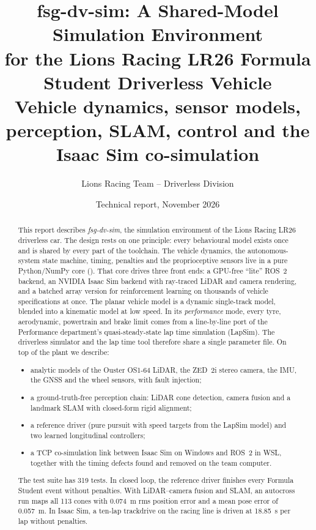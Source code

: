 \documentclass[11pt]{article}
\title{\textbf{fsg-dv-sim: A Shared-Model Simulation Environment\\for the Lions Racing LR26 Formula Student Driverless Vehicle}\\[4pt]
\large Vehicle dynamics, sensor models, perception, SLAM, control and the Isaac Sim co-simulation}
\author{Lions Racing Team -- Driverless Division}
\affil{Formula Student Germany}
\date{Technical report, November 2026}
\begin{document}
\maketitle
\thispagestyle{fancy}

\begin{abstract}
\noindent
This report describes \emph{fsg-dv-sim}, the simulation environment of the Lions Racing LR26 driverless car. The
design rests on one principle: every behavioural model exists once and is shared by every part of the toolchain. The
vehicle dynamics, the autonomous-system state machine, timing, penalties and the proprioceptive sensors live in a
pure Python/NumPy core (). That core drives three front ends: a GPU-free ``lite'' ROS~2 backend, an
NVIDIA Isaac Sim backend with ray-traced LiDAR and camera rendering, and a batched array version for reinforcement
learning on thousands of vehicle specifications at once. The planar vehicle model is a dynamic single-track model,
blended into a kinematic model at low speed. In its \emph{performance} mode, every tyre, aerodynamic, powertrain and
brake limit comes from a line-by-line port of the Performance department's quasi-steady-state lap time simulation
(LapSim). The driverless simulator and the lap time tool therefore share a single parameter file. On top of the
plant we describe:
\begin{itemize}
  \item analytic models of the Ouster OS1-64 LiDAR, the ZED~2i stereo camera, the IMU, the GNSS and the wheel
        sensors, with fault injection;
  \item a ground-truth-free perception chain: LiDAR cone detection, camera fusion and a landmark SLAM with
        closed-form rigid alignment;
  \item a reference driver (pure pursuit with speed targets from the LapSim model) and two learned longitudinal
        controllers;
  \item a TCP co-simulation link between Isaac Sim on Windows and ROS~2 in WSL, together with the timing defects
        found and removed on the team computer.
\end{itemize}
The test suite has 319 tests. In closed loop, the reference driver finishes every Formula Student
event without penalties. With LiDAR--camera fusion and SLAM, an autocross run maps all 113 cones with
\SI{0.074}{m} rms position error and a mean pose error of \SI{0.057}{m}. In Isaac Sim, a ten-lap trackdrive on the
racing line is driven at \SI{18.85}{s} per lap without penalties.
\end{abstract}
\end{document}
